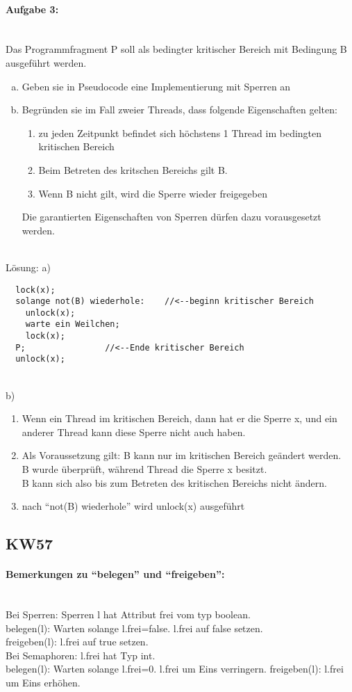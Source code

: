 \documentclass[a4paper,12pt]{scrartcl}
\begin{document}
 \paragraph{Aufgabe 3:}\quad\\
 Das Programmfragment P soll als bedingter kritischer Bereich mit Bedingung B ausgeführt werden.
 \begin{enumerate}[a)]
  \item Geben sie in Pseudocode eine Implementierung mit Sperren an
  \item Begründen sie im Fall zweier Threads, dass folgende Eigenschaften gelten:
  \begin{enumerate}[(1)]
   \item zu jeden Zeitpunkt befindet sich höchstens 1 Thread im bedingten kritischen Bereich
   \item Beim Betreten des kritschen Bereichs gilt B.
   \item Wenn B nicht gilt, wird die Sperre wieder freigegeben
  \end{enumerate}
  Die garantierten Eigenschaften von Sperren dürfen dazu vorausgesetzt werden.
 \end{enumerate}
 \quad\\
 Lösung: a)
 \begin{lstlisting}
  lock(x);
  solange not(B) wiederhole:  	//<--beginn kritischer Bereich
    unlock(x);
    warte ein Weilchen;
    lock(x);
  P;				//<--Ende kritischer Bereich
  unlock(x);
 \end{lstlisting}
  \quad\\
 b)
 \begin{enumerate}[(1)]
  \item  Wenn ein Thread im kritischen Bereich, dann hat er die Sperre x, und ein anderer Thread kann diese Sperre nicht auch haben.
  \item Als Voraussetzung gilt: B kann nur im kritischen Bereich geändert werden.\\
    B wurde überprüft, während Thread die Sperre x besitzt.\\
    B kann sich also bis zum Betreten des kritischen Bereichs nicht ändern.
  \item nach "`not(B) wiederhole"' wird unlock(x) ausgeführt
 \end{enumerate}

\subsection{KW57}
\paragraph{Bemerkungen zu "`belegen"' und "`freigeben"':}\quad\\
Bei Sperren: Sperren l hat Attribut frei vom typ boolean.\\
belegen(l): Warten solange l.frei=false. l.frei auf false setzen.\\
freigeben(l): l.frei auf true setzen.\\
Bei Semaphoren: l.frei hat Typ int.\\
belegen(l): Warten solange l.frei=0. l.frei um Eins verringern.
freigeben(l): l.frei um Eins erhöhen.
\end{document}
